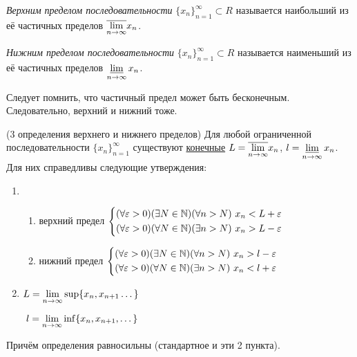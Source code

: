 \begin{definition}
	\textit{Верхним пределом последовательности} $\{x_n\}_{n = 1}^\infty
	\subset R$ называется наибольший из её частичных пределов
	$\overline{\lim\limits_{n \rightarrow \infty}} x_n$.
\end{definition}

\begin{definition}
	\textit{Нижним пределом последовательности} $\{x_n\}_{n = 1}^\infty
	\subset R$ называется наименьший из её частичных пределов
	$\varliminf\limits_{n \rightarrow \infty} x_n$.
\end{definition}

\begin{anote}
	Следует помнить, что частичный предел может быть бесконечным.
	Следовательно, верхний и нижний тоже.
\end{anote}

\begin{theorem} (3 определения верхнего и нижнего пределов)
	Для любой ограниченной последовательности $\{x_n\}_{n = 1}^\infty$
	существуют \underline{конечные} $L = \overline{\lim\limits_{n \to \infty}}
	x_n$, $l = \varliminf\limits_{n \to \infty} x_n$.
	Для них справедливы следующие утверждения:
	\begin{enumerate}
		\item
		\begin{enumerate}
			\item верхний предел
			$\left\{\begin{aligned}
			(\forall \varepsilon > 0)(\exists N \in \mathbb{N})
			(\forall n > N)\ x_n < L + \varepsilon 
			\\
			(\forall \varepsilon > 0)(\forall N \in \mathbb{N})(\exists n > N)
			\ x_n > L - \varepsilon\end{aligned}\right.$ 
			
			\item нижний предел
			$\left\{\begin{aligned}
			(\forall \varepsilon > 0)(\exists N \in \mathbb{N})(\forall n > N)
			\ x_n > l - \varepsilon
			\\
			(\forall \varepsilon > 0)
			(\forall N \in \mathbb{N})(\exists n > N)\ x_n < l + \varepsilon\end{aligned}\right.$
		\end{enumerate}
		
		\item 
			$L = \lim\limits_{n \to \infty} \sup \{x_n, x_{n + 1} \dots\}$
		
			$\ l = \lim\limits_{n \to \infty} \inf \{x_n, x_{n + 1}, \dots\}$
	\end{enumerate}
	Причём определения равносильны (стандартное и эти 2 пункта).
\end{theorem}

